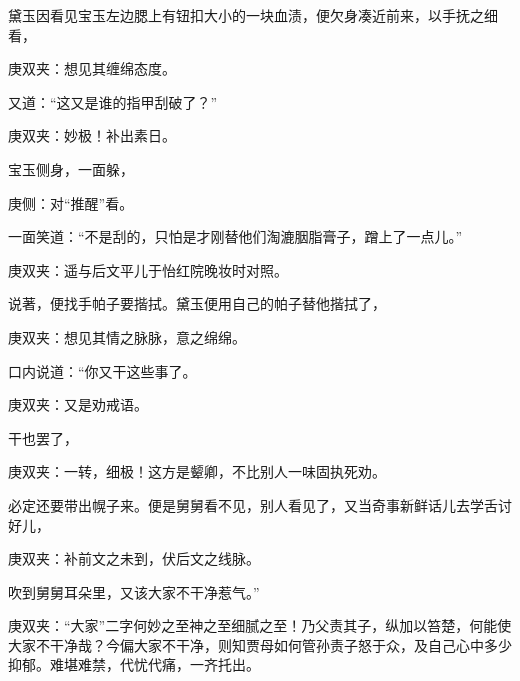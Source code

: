 \begin{parag}
    黛玉因看见宝玉左边腮上有钮扣大小的一块血渍，便欠身凑近前来，以手抚之细看，\begin{note}庚双夹：想见其缠绵态度。\end{note}又道：“这又是谁的指甲刮破了？”\begin{note}庚双夹：妙极！补出素日。\end{note}宝玉侧身，一面躲，\begin{note}庚侧：对“推醒”看。\end{note}一面笑道：“不是刮的，只怕是才刚替他们淘漉胭脂膏子，蹭上了一点儿。”\begin{note}庚双夹：遥与后文平儿于怡红院晚妆时对照。\end{note}说著，便找手帕子要揩拭。黛玉便用自己的帕子替他揩拭了，\begin{note}庚双夹：想见其情之脉脉，意之绵绵。\end{note}口内说道：“你又干这些事了。\begin{note}庚双夹：又是劝戒语。\end{note}干也罢了，\begin{note}庚双夹：一转，细极！这方是颦卿，不比别人一味固执死劝。\end{note}必定还要带出幌子来。便是舅舅看不见，别人看见了，又当奇事新鲜话儿去学舌讨好儿，\begin{note}庚双夹：补前文之未到，伏后文之线脉。\end{note}吹到舅舅耳朵里，又该大家不干净惹气。”\begin{note}庚双夹：“大家”二字何妙之至神之至细腻之至！乃父责其子，纵加以笞楚，何能使大家不干净哉？今偏大家不干净，则知贾母如何管孙责子怒于众，及自己心中多少抑郁。难堪难禁，代忧代痛，一齐托出。\end{note}
\end{parag}


